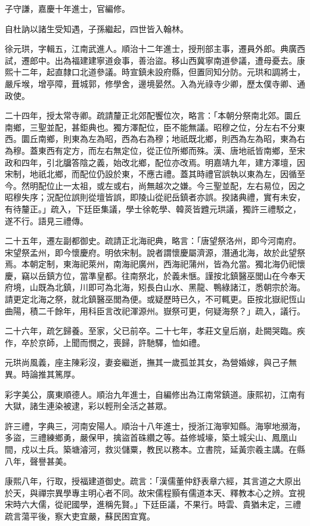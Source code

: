 \begin{pinyinscope}
子守謙，嘉慶十年進士，官編修。

自杜訥以諸生受知遇，子孫繼起，四世皆入翰林。

徐元珙，字輯五，江南武進人。順治十二年進士，授刑部主事，遷員外郎。典廣西試，遷郎中。出為福建建寧道僉事，善治盜。移山西冀寧南道參議，遭母憂去。康熙十二年，起直隸口北道參議。時宣鎮未設府縣，但置同知分防。元珙和調將士，嚴斥堠，增亭障，葺城郭，修學舍，邊境晏然。入為光祿寺少卿，歷太僕寺卿、通政使。

二十四年，授太常寺卿。疏請釐正北郊配饗位次，略言：「本朝分祭南北郊。圜丘南鄉，三聖並配，甚鉅典也。獨方澤配位，臣不能無議。昭穆之位，分左右不分東西。圜丘南鄉，則東為左為昭，西為右為穆；地祇既北鄉，則西為左為昭，東為右為穆。蓋東西有定方，而左右無定位，從正位所鄉而殊。漢、唐地祇皆南鄉，至宋政和四年，引北牖答陰之義，始改北鄉，配位亦改焉。明嘉靖九年，建方澤壇，因宋制，地祇北鄉，而配位仍設於東，不應古禮。蓋其時禮官誤執以東為左，因循至今。然明配位止一太祖，或左或右，尚無越次之嫌。今三聖並配，左右易位，因之昭穆失序；況配位誤則從壇皆誤，即陵山從祀岳鎮者亦誤。揆諸典禮，實有未安，有待釐正。」疏入，下廷臣集議，學士徐乾學、韓菼皆韙元珙議，獨許三禮駁之，遂不行。語見三禮傳。

二十五年，遷左副都御史。疏請正北海祀典，略言：「唐望祭洛州，即今河南府。宋望祭孟州，即今懷慶府。明依宋制。說者謂懷慶屬濟源，潛通北海，故於此望祭焉。本朝定制，東海祀萊州，南海祀廣州，西海祀蒲州，皆為允當。獨北海仍祀懷慶，竊以岳鎮方位，當準皇都。往南祭北，於義未愜。謹按北鎮醫巫閭山在今奉天府境，山既為北鎮，川即可為北海，矧長白山水、黑龍、鴨綠諸江，悉朝宗於海。請更定北海之祭，就北鎮醫巫閭為便。或疑歷時已久，不可輒更。臣按北嶽祀恆山曲陽，積二千餘年，用科臣言改祀渾源州。嶽祭可更，何疑海祭？」疏入，議行。

二十六年，疏乞歸養。至家，父已前卒。二十七年，孝莊文皇后崩，赴闕哭臨。疾作，卒於京師，上聞而憫之，喪歸，許馳驛，恤如禮。

元珙尚風義，座主陳彩沒，妻妾繼逝，撫其一歲孤並其女，為營婚嫁，與己子無異。時論推其篤厚。

彩字美公，廣東順德人。順治九年進士，自編修出為江南常鎮道。康熙初，江南有大獄，諸生連染被逮，彩以輕刑全活之甚眾。

許三禮，字典三，河南安陽人。順治十八年進士，授浙江海寧知縣。海寧地瀕海，多盜，三禮練鄉勇，嚴保甲，擒盜首硃纘之等。益修城壕，築土城尖山、鳳凰山間，戍以土兵。築塘濬河，救災儲粟，教民以務本。立書院，延黃宗羲主講。在縣八年，聲譽甚美。

康熙八年，行取，授福建道御史。疏言：「漢儒董仲舒表章六經，其言道之大原出於天，與禪宗異學專主明心者不同。故宋儒程顥有儒道本天、釋教本心之辨。宜視宋時六大儒，從祀國學，進稱先賢。」下廷臣議，不果行。時雲、貴猶未定，三禮疏言蕩平後，察大吏宜嚴，蘇民困宜寬。


\end{pinyinscope}
